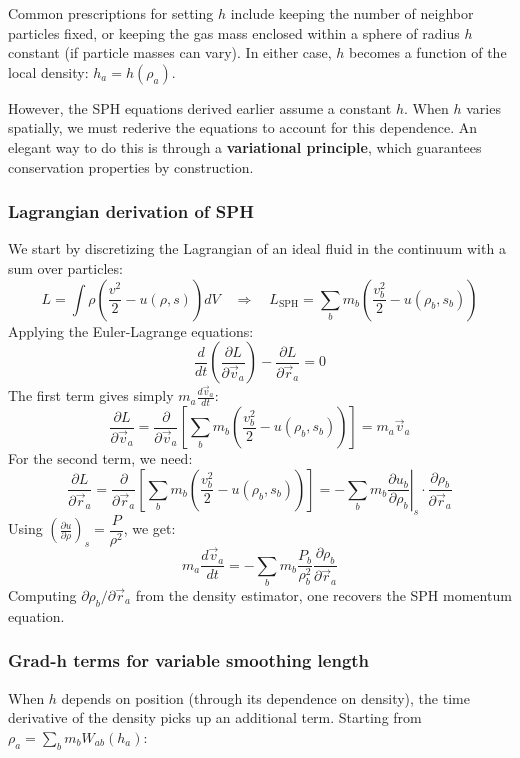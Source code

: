Common prescriptions for setting $h$ include keeping the number of neighbor particles fixed, or keeping the gas mass enclosed within a sphere of radius $h$ constant (if particle masses can vary). In either case, $h$ becomes a function of the local density: $h_a = h(\rho_a)$.

However, the SPH equations derived earlier assume a constant $h$. When $h$ varies spatially, we must rederive the equations to account for this dependence. An elegant way to do this is through a \textbf{variational principle}, which guarantees conservation properties by construction.

\subsubsection{Lagrangian derivation of SPH}

We start by discretizing the Lagrangian of an ideal fluid in the continuum with a sum over particles:
$$
L = \int \rho \left( \dfrac{v^2}{2} - u(\rho, s) \right) dV
\quad \Longrightarrow \quad
L_{\text{SPH}} = \sum_b m_b \left( \dfrac{v_b^2}{2} - u(\rho_b, s_b) \right)
$$
Applying the Euler-Lagrange equations:
$$
\dfrac{d}{dt} \left( \dfrac{\partial L}{\partial \vec{v}_a} \right) - \dfrac{\partial L}{\partial \vec{r}_a} = 0
$$
The first term gives simply $m_a \frac{d\vec{v}_a}{dt}$:
$$
\dfrac{\partial L}{\partial \vec{v}_a} = \dfrac{\partial}{\partial \vec{v}_a} \left[ \sum_b m_b \left( \dfrac{v_b^2}{2} - u(\rho_b, s_b) \right) \right] = m_a \vec{v}_a
$$
For the second term, we need:
$$
\dfrac{\partial L}{\partial \vec{r}_a} = \dfrac{\partial}{\partial \vec{r}_a} \left[ \sum_b m_b \left( \dfrac{v_b^2}{2} - u(\rho_b, s_b) \right) \right]
= -\sum_b m_b \left. \dfrac{\partial u_b}{\partial \rho_b} \right|_s \cdot \dfrac{\partial \rho_b}{\partial \vec{r}_a}
$$
Using $\left( \frac{\partial u}{\partial \rho} \right)_s = \dfrac{P}{\rho^2}$, we get:
$$
m_a \frac{d\vec{v}_a}{dt} = -\sum_b m_b \dfrac{P_b}{\rho_b^2} \dfrac{\partial \rho_b}{\partial \vec{r}_a}
$$
Computing $\partial \rho_b / \partial \vec{r}_a$ from the density estimator, one recovers the SPH momentum equation.

\subsubsection{Grad-h terms for variable smoothing length}

When $h$ depends on position (through its dependence on density), the time derivative of the density picks up an additional term. Starting from $\rho_a = \sum_b m_b W_{ab}(h_a)$:


